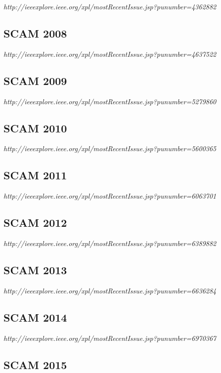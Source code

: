 {\small \em http://ieeexplore.ieee.org/xpl/mostRecentIssue.jsp?punumber=4362882}

\subsection{SCAM 2008}

{\small \em http://ieeexplore.ieee.org/xpl/mostRecentIssue.jsp?punumber=4637522}

\subsection{SCAM 2009}

{\small \em http://ieeexplore.ieee.org/xpl/mostRecentIssue.jsp?punumber=5279860}

\subsection{SCAM 2010}

{\small \em http://ieeexplore.ieee.org/xpl/mostRecentIssue.jsp?punumber=5600365}

\subsection{SCAM 2011}

{\small \em http://ieeexplore.ieee.org/xpl/mostRecentIssue.jsp?punumber=6063701}

\subsection{SCAM 2012}

{\small \em http://ieeexplore.ieee.org/xpl/mostRecentIssue.jsp?punumber=6389882}

\subsection{SCAM 2013}

{\small \em http://ieeexplore.ieee.org/xpl/mostRecentIssue.jsp?punumber=6636284}

\subsection{SCAM 2014}

{\small \em http://ieeexplore.ieee.org/xpl/mostRecentIssue.jsp?punumber=6970367}

\subsection{SCAM 2015}

